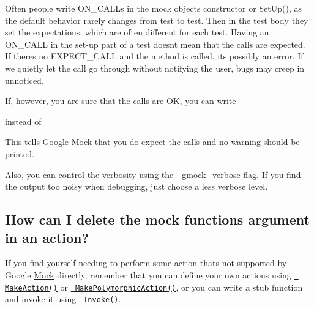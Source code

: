 Often people write {\ttfamily O\+N\+\_\+\+C\+A\+LL}s in the mock object\textquotesingle{}s constructor or {\ttfamily Set\+Up()}, as the default behavior rarely changes from test to test. Then in the test body they set the expectations, which are often different for each test. Having an {\ttfamily O\+N\+\_\+\+C\+A\+LL} in the set-\/up part of a test doesn\textquotesingle{}t mean that the calls are expected. If there\textquotesingle{}s no {\ttfamily E\+X\+P\+E\+C\+T\+\_\+\+C\+A\+LL} and the method is called, it\textquotesingle{}s possibly an error. If we quietly let the call go through without notifying the user, bugs may creep in unnoticed.

If, however, you are sure that the calls are OK, you can write


\begin{DoxyCode}{0}
\end{DoxyCode}


instead of


\begin{DoxyCode}{0}
\end{DoxyCode}


This tells Google \mbox{\hyperlink{class_mock}{Mock}} that you do expect the calls and no warning should be printed.

Also, you can control the verbosity using the {\ttfamily -\/-\/gmock\+\_\+verbose} flag. If you find the output too noisy when debugging, just choose a less verbose level.

\subsection*{How can I delete the mock function\textquotesingle{}s argument in an action?}

If you find yourself needing to perform some action that\textquotesingle{}s not supported by Google \mbox{\hyperlink{class_mock}{Mock}} directly, remember that you can define your own actions using \href{http://code.google.com/p/googlemock/wiki/V1_6_CookBook#Writing_New_Actions}\texttt{ Make\+Action()} or \href{http://code.google.com/p/googlemock/wiki/V1_6_CookBook#Writing_New_Polymorphic_Actions}\texttt{ Make\+Polymorphic\+Action()}, or you can write a stub function and invoke it using \href{http://code.google.com/p/googlemock/wiki/V1_6_CookBook#Using_Functions_Methods_Functors}\texttt{ Invoke()}.

